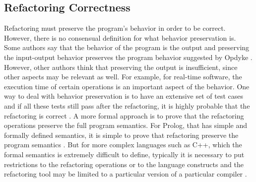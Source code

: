 

\subsection{Refactoring Correctness}
%
Refactoring must preserve the program's behavior in order to be correct.
However, there is no consensual definition for what behavior preservation is.
Some authors say that the behavior of the program is the output and preserving the input-output behavior preserves the program behavior suggested by Opdyke \cite{opdyke1992refactoring}.
However, other authors think that preserving the output is insufficient, since other aspects may be relevant as well. For example, for real-time software, the execution time of certain operations is an important aspect of the behavior.
One way to deal with behavior preservation is to have an extensive set of test cases and if all these tests still pass after the refactoring, it is highly probable that the refactoring is correct \cite{mens2004survey}.
A more formal approach is to prove that the refactoring operations preserve the full program semantics. For Prolog, that has simple and formally defined semantics, it is simple to prove that refactoring preserve the program semantics \cite{proietti1991semantics}. %
But for more complex languages such as C++, which the formal semantics is extremely difficult to define, typically it is necessary to put restrictions to the refactoring operations or to the language constructs and the refactoring tool may be limited to a particular version of a particular compiler \cite{tokuda2001evolving}.%



